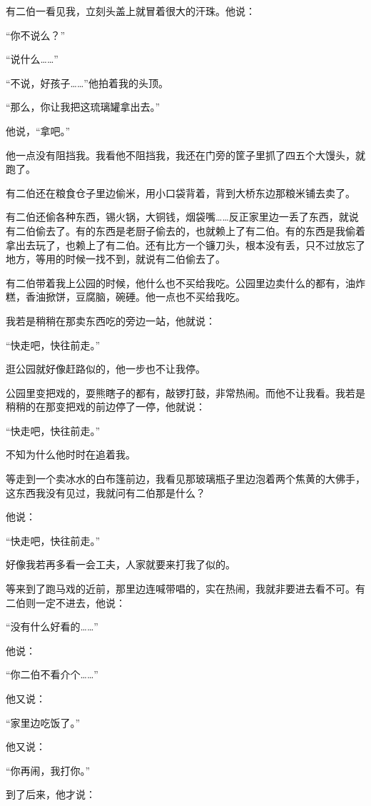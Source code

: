 \par 有二伯一看见我，立刻头盖上就冒着很大的汗珠。他说：
\par “你不说么？”
\par “说什么……”
\par “不说，好孩子……”他拍着我的头顶。
\par “那么，你让我把这琉璃罐拿出去。”
\par 他说，“拿吧。”
\par 他一点没有阻挡我。我看他不阻挡我，我还在门旁的筐子里抓了四五个大馒头，就跑了。
\par 有二伯还在粮食仓子里边偷米，用小口袋背着，背到大桥东边那粮米铺去卖了。
\par 有二伯还偷各种东西，锡火锅，大铜钱，烟袋嘴……反正家里边一丢了东西，就说有二伯偷去了。有的东西是老厨子偷去的，也就赖上了有二伯。有的东西是我偷着拿出去玩了，也赖上了有二伯。还有比方一个镰刀头，根本没有丢，只不过放忘了地方，等用的时候一找不到，就说有二伯偷去了。
\par 有二伯带着我上公园的时候，他什么也不买给我吃。公园里边卖什么的都有，油炸糕，香油掀饼，豆腐脑，碗硾。他一点也不买给我吃。
\par 我若是稍稍在那卖东西吃的旁边一站，他就说：
\par “快走吧，快往前走。”
\par 逛公园就好像赶路似的，他一步也不让我停。
\par 公园里变把戏的，耍熊瞎子的都有，敲锣打鼓，非常热闹。而他不让我看。我若是稍稍的在那变把戏的前边停了一停，他就说：
\par “快走吧，快往前走。”
\par 不知为什么他时时在追着我。
\par 等走到一个卖冰水的白布篷前边，我看见那玻璃瓶子里边泡着两个焦黄的大佛手，这东西我没有见过，我就问有二伯那是什么？
\par 他说：
\par “快走吧，快往前走。”
\par 好像我若再多看一会工夫，人家就要来打我了似的。
\par 等来到了跑马戏的近前，那里边连喊带唱的，实在热闹，我就非要进去看不可。有二伯则一定不进去，他说：
\par “没有什么好看的……”
\par 他说：
\par “你二伯不看介个……”
\par 他又说：
\par “家里边吃饭了。”
\par 他又说：
\par “你再闹，我打你。”
\par 到了后来，他才说：
